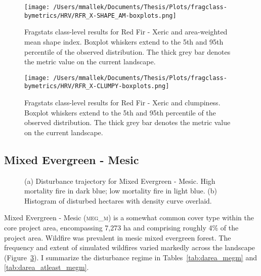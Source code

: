 \begin{figure}[!htbp]
\centering
    \texttt{[image: /Users/mmallek/Documents/Thesis/Plots/fragclass-bymetrics/HRV/RFR\_X-SHAPE\_AM-boxplots.png]}
  \caption{Fragstats class-level results for Red Fir - Xeric and area-weighted mean shape index. Boxplot whiskers extend to the 5th and 95th percentile of the observed distribution. The thick grey bar denotes the metric value on the current landscape.}
  \label{fig:rfrx_shapeam}
\end{figure}


\begin{figure}[!htbp]
\centering
    \texttt{[image: /Users/mmallek/Documents/Thesis/Plots/fragclass-bymetrics/HRV/RFR\_X-CLUMPY-boxplots.png]}
  \caption{Fragstats class-level results for Red Fir - Xeric and clumpiness. Boxplot whiskers extend to the 5th and 95th percentile of the observed distribution. The thick grey bar denotes the metric value on the current landscape.}
  \label{fig:rfrx_clumpy}
\end{figure}




\clearpage
\subsection{Mixed Evergreen - Mesic} 
\begin{figure}[!htbp]
  \centering
  \caption{(a) \small Disturbance trajectory for Mixed Evergreen - Mesic. High mortality fire in dark blue; low mortality fire in light blue. (b) Histogram of disturbed hectares with density curve overlaid.} 
  \label{fig:darea_megm}
\end{figure}

Mixed Evergreen - Mesic (\textsc{meg\_m}) is a somewhat common cover type within the core project area, encompassing 7,273 ha and comprising roughly 4\% of the project area. Wildfire was prevalent in mesic mixed evergreen forest. The frequency and extent of simulated wildfires  varied markedly across the landscape (Figure~\ref{fig:darea_megm}). I summarize the disturbance regime in Tables~\ref{tab:darea_megm} and \ref{tab:darea_atleast_megm}.

